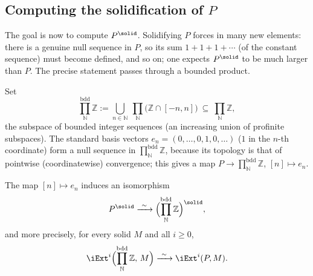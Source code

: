 \subsection{Computing the solidification of \texorpdfstring{$P$}{P}}

The goal is now to compute $P^{\solid}$. Solidifying $P$ forces in many new
elements: there is a genuine null sequence in $P$, so its sum $1+1+1+\cdots$ (of
the constant sequence) must become defined, and so on; one expects $P^{\solid}$
to be much larger than $P$. The precise statement passes through a bounded
product.

\begin{notation}
\label{not:5:bounded-product}
Set
\begin{equation*}
\prod_{\mathbb{N}}^{\mathrm{bdd}}\mathbb{Z}
:=\bigcup_{n\in\mathbb{N}}\ \prod_{\mathbb{N}}\bigl(\mathbb{Z}\cap[-n,n]\bigr)
\ \subseteq\ \prod_{\mathbb{N}}\mathbb{Z},
\end{equation*}
the subspace of bounded integer sequences (an increasing union of profinite
subspaces). The standard basis vectors $e_n=(0,\dots,0,1,0,\dots)$ ($1$ in the
$n$-th coordinate) form a null sequence in $\prod_{\mathbb{N}}^{\mathrm{bdd}}
\mathbb{Z}$, because its topology is that of pointwise (coordinatewise)
convergence; this gives a map $P\to\prod_{\mathbb{N}}^{\mathrm{bdd}}\mathbb{Z}$,
$[n]\mapsto e_n$.
\end{notation}

\begin{lemma}
\label{lem:5:P-bounded-product}
The map $[n]\mapsto e_n$ induces an isomorphism
\begin{equation*}
P^{\solid}\xrightarrow{\ \sim\ }\Bigl(\prod_{\mathbb{N}}^{\mathrm{bdd}}\mathbb{Z}
\Bigr)^{\solid},
\end{equation*}
and more precisely, for every solid $M$ and all $i\ge0$,
\begin{equation*}
\iExt^{i}\Bigl(\prod_{\mathbb{N}}^{\mathrm{bdd}}\mathbb{Z},\,M\Bigr)
\xrightarrow{\ \sim\ }\iExt^{i}(P,M).
\end{equation*}
\end{lemma}

